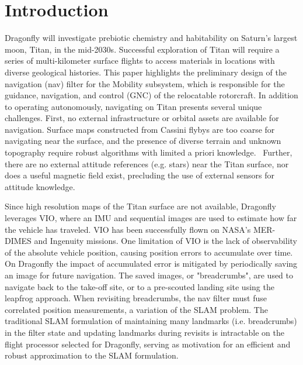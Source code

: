 \section{Introduction}

Dragonfly will investigate prebiotic chemistry and habitability on Saturn's largest moon, Titan, in the mid-2030s.\cite{barnes2021science,lorenzTitan} Successful exploration of Titan will require a series of multi-kilometer surface flights to access materials in locations with diverse geological histories.\cite{lorenz2018dragonfly, mcgee2018guidance} This paper highlights the preliminary design of the navigation (nav) filter for the Mobility subsystem, which is responsible for the guidance, navigation, and control (GNC) of the relocatable rotorcraft. In addition to operating autonomously, navigating on Titan presents several unique challenges. First, no external infrastructure or orbital assets are available for navigation. Surface maps constructed from Cassini flybys are too coarse for navigating near the surface, and the presence of diverse terrain and unknown topography require robust algorithms with limited a priori knowledge.~\cite{Lorenz_2021} Further, there are no external attitude references (e.g. stars) near the Titan surface, nor does a useful magnetic field exist, precluding the use of external sensors for attitude knowledge. 

Since high resolution maps of the Titan surface are not available, Dragonfly leverages \ac{VIO}, where an \ac{IMU} and sequential images are used to estimate how far the vehicle has traveled. \ac{VIO} has been successfully flown on NASA's MER-DIMES and Ingenuity missions.\cite{MER, ingenuityNav} One limitation of \ac{VIO} is the lack of observability of the absolute vehicle position, causing position errors to accumulate over time. On Dragonfly the impact of accumulated error is mitigated by periodically saving an image for future navigation.\cite{mcgee2018guidance}  The saved images, or "breadcrumbs", are used to navigate back to the take-off site, or to a pre-scouted landing site using the leapfrog approach.\cite{mcgee2018guidance, witte2019no, schilling2019} When revisiting breadcrumbs, the nav filter must fuse correlated position measurements, a variation of the \ac{SLAM} problem.\cite{smith1990estimating, moutarlier1991incremental} The traditional \ac{SLAM} formulation of maintaining many landmarks (i.e. breadcrumbs) in the filter state and updating landmarks during revisits is intractable on the flight processor selected for Dragonfly, serving as motivation for an efficient and robust approximation to the \ac{SLAM} formulation.

